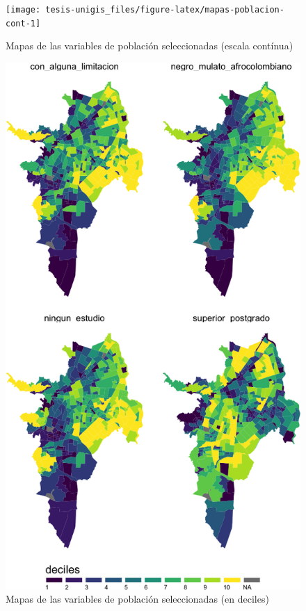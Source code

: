 \documentclass[12pt,]{book}
\begin{document}
\begin{figure}
\texttt{[image: tesis-unigis\_files/figure-latex/mapas-poblacion-cont-1]} \caption{Mapas de las variables de población seleccionadas (escala contínua)}\label{fig:mapas-poblacion-cont}
\end{figure}

\begin{figure}
\includegraphics[width=1\linewidth]{tesis-unigis_files/figure-latex/mapas-poblacion-deciles-1} \caption{Mapas de las variables de población seleccionadas (en deciles)}\label{fig:mapas-poblacion-deciles}
\end{figure}
\end{document}
